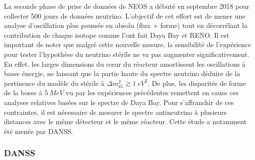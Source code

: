 La seconde phase de prise de données de NEOS a débuté en septembre 2018 pour collecter 500 jours de données neutrino. L'objectif de cet effort est de mener une analyse d'oscillation plus poussée en absolu (flux + forme) tout en décorrélant la contribution de chaque isotope comme l'ont fait Daya Bay et RENO. Il est important de noter que malgré cette nouvelle mesure, la sensibilité de l'expérience pour tester l'hypothèse du neutrino stérile ne va pas augmenter significativement. En effet, les larges dimensions du c\oe ur du réacteur amortissent les oscillations à basse énergie, ne laissant que la partie haute du spectre neutrino déduire de la pertinence du modèle du stérile à $\Delta m^2_{41} \gtrsim \SI{1}{eV^2}$. De plus, les disparités de forme de la bosse à $\SI{5}{MeV}$ vu par les expériences précédentes remettent en cause ces analyses relatives basées sur le spectre de Daya Bay. Pour s'affranchir de ces contraintes, il est nécessaire de mesurer le spectre antineutrino à plusieurs distances avec le même détecteur et le même réacteur. Cette étude a notamment été menée par DANSS.

\bigbreak

\subsubsection*{DANSS}


